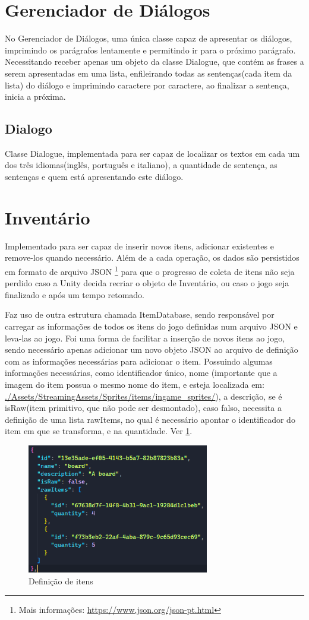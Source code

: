 \section{Gerenciador de Diálogos}
No Gerenciador de Diálogos, uma única classe capaz de apresentar os diálogos, imprimindo os parágrafos lentamente e permitindo ir para o próximo parágrafo. Necessitando receber apenas um objeto da classe Dialogue, que contém as frases a serem apresentadas em uma lista, enfileirando todas as sentenças(cada item da lista) do diálogo e imprimindo caractere por caractere, ao finalizar a sentença, inicia a próxima.
\subsection{Dialogo}
Classe Dialogue, implementada para ser capaz de localizar os textos em cada um dos três idiomas(inglês, português e italiano), a quantidade de sentença, as sentenças e quem está apresentando este diálogo.

\break
\section{Inventário}
Implementado para ser capaz de inserir novos itens, adicionar existentes e remove-los quando necessário. Além de a cada operação, os dados são persistidos em formato de arquivo JSON \footnote{Mais informações: \url{https://www.json.org/json-pt.html}} para que o progresso de coleta de itens não seja perdido caso a Unity decida recriar o objeto de Inventário, ou caso o jogo seja finalizado e após um tempo retomado. 
\par
Faz uso de outra estrutura chamada ItemDatabase, sendo responsável por carregar as informações de todos os itens do jogo definidas num arquivo JSON e leva-las ao jogo. Foi uma forma de facilitar a inserção de novos itens ao jogo, sendo necessário apenas adicionar um novo objeto JSON ao arquivo de definição com as informações necessárias para adicionar o item. Possuindo algumas informações necessárias, como identificador único, nome (importante que a imagem do item possua o mesmo nome do item, e esteja localizada em: \url{./Assets/StreamingAssets/Sprites/items/ingame_sprites/}), a descrição, se é isRaw(item primitivo, que não pode ser desmontado), caso falso, necessita a definição de uma lista rawItems, no qual é necessário apontar o identificador do item em que se transforma, e na quantidade. Ver \ref{fig_item_json_definition}.
\begin{figure}[h]
    \centering
    \includegraphics[width=300px]{figuras/item_definition.png}
    \caption{Definição de itens}
    \label{fig_item_json_definition}
\end{figure}


